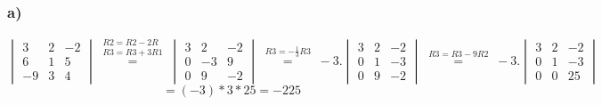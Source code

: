\documentclass[11pt]{article}
\begin{document}
\subsubsection*{a)}
\[
\begin{vmatrix}
3 & 2 & -2 \\
6 & 1 & 5 \\
-9 & 3 & 4
\end{vmatrix}
\overset{\begin{matrix}
R2 = R2-2R\\
R3=R3+3R1
\end{matrix}}{=}
\begin{vmatrix}
3 & 2 & -2 \\
0 & -3 & 9 \\
0 & 9 & -2
\end{vmatrix}
\overset{\begin{matrix}
R3=-\frac{1}{3}R3
\end{matrix}}{=}
-3.
\begin{vmatrix}
3 & 2 & -2 \\
0 & 1 & -3 \\
0 & 9 & -2
\end{vmatrix}
\overset{\begin{matrix}
R3=R3-9R2
\end{matrix}}{=}
-3.
\begin{vmatrix}
3 & 2 & -2 \\
0 & 1 & -3 \\
0 & 0 & 25
\end{vmatrix}
\]
\[
= (-3)*3*25=-225
\]
\end{document}
